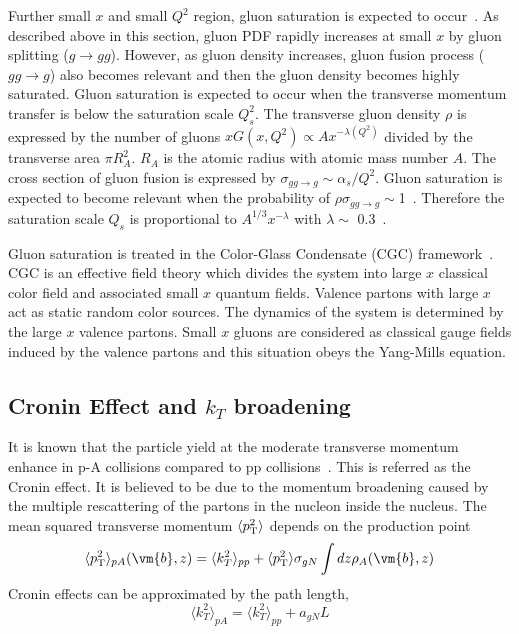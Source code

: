 Further small $x$ and small $Q^{2}$ region, gluon saturation is expected to occur~\cite{bib_saturation}. 
As described above in this section, gluon PDF rapidly increases at small $x$ by gluon splitting ($g\rightarrow gg$). 
However, as gluon density increases, gluon fusion process ($gg\rightarrow g$) also becomes relevant and then the gluon density becomes highly saturated. 
Gluon saturation is expected to occur when the transverse momentum transfer is below the saturation scale $Q_{s}^{2}$.
The transverse gluon density $\rho$ is expressed by the number of gluons $xG(x, Q^{2})\propto Ax^{-\lambda(Q^{2})}$ divided by the transverse area $\pi R_{A}^{2}$.
$R_{A}$ is the atomic radius with atomic mass number $A$. 
The cross section of gluon fusion is expressed by $\sigma_{gg\rightarrow g}\sim \alpha_{s}/Q^{2}$.
Gluon saturation is expected to become relevant when the probability of $\rho \sigma_{gg\rightarrow g}\sim$1~\cite{bib_saturation}. 
Therefore the saturation scale $Q_{s}$ is proportional to $A^{1/3}x^{-\lambda}$ with $\lambda \sim$ 0.3~\cite{bib_geoscale,bib_saturationscale}.

Gluon saturation is treated in the Color-Glass Condensate (CGC) framework~\cite{bib_cgc}.
CGC is an effective field theory which divides the system into large $x$ classical color field and associated small $x$ quantum fields. 
Valence partons with large $x$ act as static random color sources. 
The dynamics of the system is determined by the large $x$ valence partons. 
Small $x$ gluons are considered as classical gauge fields induced by the valence partons and this situation obeys the Yang-Mills equation. 



\subsection{Cronin Effect and $k_{T}$ broadening}
It is known that the particle yield at the moderate transverse momentum enhance in p-A collisions compared to pp collisions~\cite{bib_cronin}.
This is referred as the Cronin effect. 
It is believed to be due to the momentum broadening caused by the multiple rescattering of the partons in the nucleon inside the nucleus.  
The mean squared transverse momentum $\langle p_{\rm{T}}^{2}\rangle$ depends on the production point
\begin{equation}
  \langle p_{\rm{T}}^{2}\rangle_{pA}(\vm{b}, z) =  \langle k_{T}^{2} \rangle_{pp} + \langle p_{\rm{T}}^{2}\rangle \sigma_{gN} \int dz\rho_{A}(\vm{b}, z)
\end{equation}
Cronin effects can be approximated by the path length, 
\begin{equation}
  \langle k_{T}^{2} \rangle_{pA} =   \langle k_{T}^{2} \rangle_{pp} +  a_{gN}L%
  \label{eq_2_cronin}
\end{equation}

